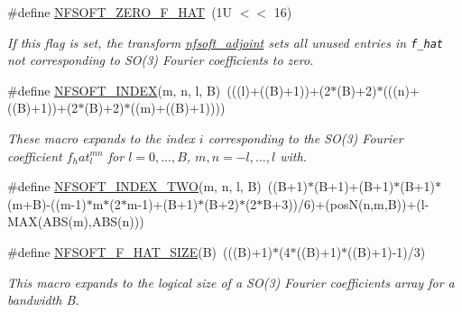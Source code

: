\begin{CompactItemize}
\#define \hyperlink{group__nfsoft_gdaa4a4436a6a9e8b491660bb5fc54f8e}{NFSOFT\_\-ZERO\_\-F\_\-HAT}~(1U $<$$<$ 16)
\begin{CompactList}\small\item\em If this flag is set, the transform \hyperlink{group__nfsoft_g08395b1dd90f9a2565685d17460afc5b}{nfsoft\_\-adjoint} sets all unused entries in {\tt f\_\-hat} not corresponding to SO(3) Fourier coefficients to zero. \item\end{CompactList}\item 
\hypertarget{group__nfsoft_g796e2f298278bbed00bf0704b553be98}{
\#define \hyperlink{group__nfsoft_g796e2f298278bbed00bf0704b553be98}{NFSOFT\_\-INDEX}(m, n, l, B)~(((l)+((B)+1))+(2$\ast$(B)+2)$\ast$(((n)+((B)+1))+(2$\ast$(B)+2)$\ast$((m)+((B)+1))))}
\label{group__nfsoft_g796e2f298278bbed00bf0704b553be98}

\begin{CompactList}\small\item\em These macro expands to the index $i$ corresponding to the SO(3) Fourier coefficient $f_hat^{mn}_l$ for $l=0,...,B$, $m,n =-l,...,l$ with. \item\end{CompactList}\item 
\hypertarget{group__nfsoft_g67274491cbbbca79a4170608dec640ce}{
\#define \hyperlink{group__nfsoft_g67274491cbbbca79a4170608dec640ce}{NFSOFT\_\-INDEX\_\-TWO}(m, n, l, B)~((B+1)$\ast$(B+1)+(B+1)$\ast$(B+1)$\ast$(m+B)-((m-1)$\ast$m$\ast$(2$\ast$m-1)+(B+1)$\ast$(B+2)$\ast$(2$\ast$B+3))/6)+(posN(n,m,B))+(l-MAX(ABS(m),ABS(n)))}
\label{group__nfsoft_g67274491cbbbca79a4170608dec640ce}

\item 
\hypertarget{group__nfsoft_gd214901ec9451e6076e05d22eb734d49}{
\#define \hyperlink{group__nfsoft_gd214901ec9451e6076e05d22eb734d49}{NFSOFT\_\-F\_\-HAT\_\-SIZE}(B)~(((B)+1)$\ast$(4$\ast$((B)+1)$\ast$((B)+1)-1)/3)}
\label{group__nfsoft_gd214901ec9451e6076e05d22eb734d49}

\begin{CompactList}\small\item\em This macro expands to the logical size of a SO(3) Fourier coefficients array for a bandwidth B. \item\end{CompactList}\end{CompactItemize}
